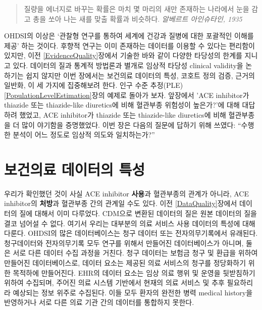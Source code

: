 \documentclass[10.5pt]{book}
\theoremstyle{definition}
\theoremstyle{definition}
\theoremstyle{definition}
\theoremstyle{remark}
\begin{document}
\begin{quote}
질량을 에너지로 바꾸는 확률은 마치 몇 마리의 새만 존재하는 나라에서 눈을
감고 총을 쏘아 나는 새를 맞출 확률과 비슷하다. \emph{알베르트
아인슈타인, 1935}
\end{quote}

OHDSI의 이상은 `관찰형 연구를 통하여 세계에 건강과 질병에 대한 포괄적인
이해를 제공' 하는 것이다. 후향적 연구는 이미 존재하는 데이터를 이용할 수
있다는 편리함이 있지만, 이전 \ref{EvidenceQuality}장에서 기술한 바와
같이 다양한 타당성의 한계를 지니고 있다. 데이터의 질과 통계적 방법론과
별개로 임상적 타당성 clinical validity을 논하기는 쉽지 않지만 이번
장에서는 보건의료 데이터의 특성, 코호트 정의 검증, 근거의 일반화, 이 세
가지에 집중해보려 한다. 인구 수준 추정(PLE)
\ref{PopulationLevelEstimation}장의 예제로 돌아가 보자. 앞장에서 'ACE
inhibitor가 thiazide 또는 thiazide-like diuretics에 비해 혈관부종
위험성이 높은가?'에 대해 대답하려 했었고, ACE inhibitor가 thiazide 또는
thiazide-like diuretics에 비해 혈관부종을 더 많이 야기함을 증명했었다.
이번 장은 다음의 질문에 답하기 위해 쓰였다: ``수행한 분석이 어느 정도로
임상적 의도와 일치하는가?'' 

\section{보건의료 데이터의 특성}\label{CharacteristicsOfDatabase}

우리가 확인했던 것이 사실 ACE inhibitor \textbf{사용}과 혈관부종의
관계가 아니라, ACE inhibitor의 \textbf{처방}과 혈관부종 간의 관계일 수도
있다. 이전 \ref{DataQuality}장에서 데이터의 질에 대해서 이미 다루었다.
CDM으로 변환된 데이터의 질은 원본 데이터의 질을 결코 넘어설 수 없다.
여기서 우리는 대부분의 의료 서비스 사용 데이터의 특성에 대해 다룬다.
OHDSI의 많은 데이터베이스는 청구 데이터 또는 전자의무기록에서 유래된다.
청구데이터와 전자의무기록 모두 연구를 위해서 만들어진 데이터베이스가
아니며, 둘은 서로 다른 데이터 수집 과정을 거친다. 청구 데이터는 보험금
청구 및 환급을 위하여 만들어진 데이터베이스로, 데이터 요소는 제공된 의료
서비스의 청구를 정당화하기 위한 목적하에 만들어진다. EHR의 데이터 요소는
임상 의료 행위 및 운영을 뒷받침하기 위하여 수집되며, 주어진 의료 시스템
기반에서 현재의 의료 서비스 및 추후 필요하리라 예상되는 정보 위주로
수집된다. 이들 모두 환자의 완전한 병력 medical history을 반영하거나 서로
다른 의료 기관 간의 데이터를 통합하지 못한다.
\end{document}
